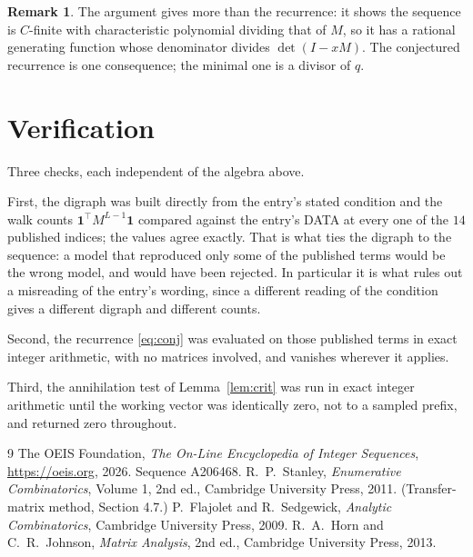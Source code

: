 \documentclass[11pt,a4paper]{article}
\theoremstyle{plain}
\theoremstyle{definition}
\newtheorem{remark}[theorem]{Remark}
\begin{document}
\begin{remark}
The argument gives more than the recurrence: it shows the sequence is $C$-finite with
characteristic polynomial dividing that of $M$, so it has a rational generating function
whose denominator divides $\det(I-xM)$. The conjectured recurrence is one consequence; the
minimal one is a divisor of $q$.
\end{remark}

\section{Verification}

Three checks, each independent of the algebra above.

First, the digraph was built directly from the entry's stated condition and the walk counts
$\mathbf{1}^{\!\top}M^{L-1}\mathbf{1}$ compared against the entry's DATA at
every one of the $14$ published indices; the values agree exactly. That is what ties
the digraph to the sequence: a model that reproduced only some of the published terms would
be the wrong model, and would have been rejected. In particular it is what rules out a
misreading of the entry's wording, since a different reading of the condition gives a
different digraph and different counts.

Second, the recurrence \eqref{eq:conj} was evaluated on those published terms in exact
integer arithmetic, with no matrices involved, and vanishes wherever it applies.

Third, the annihilation test of Lemma~\ref{lem:crit} was run in exact integer arithmetic
until the working vector was identically zero, not to a sampled prefix, and returned zero
throughout.

\begin{thebibliography}{9}
 The OEIS Foundation, \emph{The On-Line Encyclopedia of Integer
Sequences}, \url{https://oeis.org}, 2026. Sequence A206468.
 R.~P.~Stanley, \emph{Enumerative Combinatorics}, Volume 1, 2nd ed.,
Cambridge University Press, 2011. (Transfer-matrix method, Section 4.7.)
 P.~Flajolet and R.~Sedgewick, \emph{Analytic Combinatorics}, Cambridge
University Press, 2009.
 R.~A.~Horn and C.~R.~Johnson, \emph{Matrix Analysis}, 2nd ed., Cambridge
University Press, 2013.
\end{thebibliography}
\end{document}
